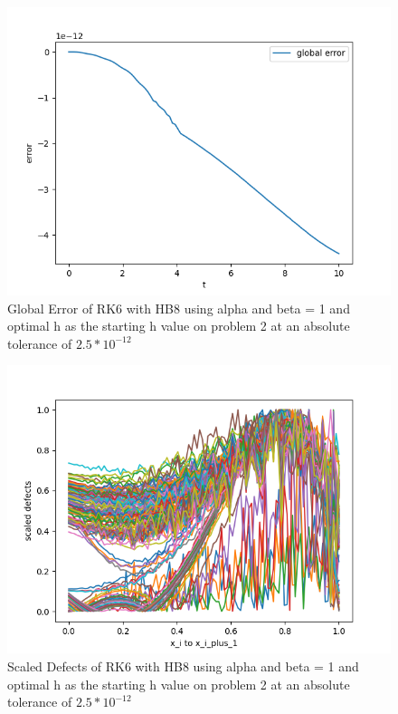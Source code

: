 \documentclass{article}
\begin{document}
\begin{figure}[H]
\centering
\includegraphics[width=0.7\linewidth]{./figures/sharp_tolerance_rk6_with_hb8_p2_global_error}
\caption{Global Error of RK6 with HB8 using alpha and beta = 1 and optimal h as the starting h value on problem 2 at an absolute tolerance of $2.5*10^{-12}$}
\label{fig:sharp_tolerance_rk6_with_hb8_p2_global_error}
\end{figure}

\begin{figure}[H]
\centering
\includegraphics[width=0.7\linewidth]{./figures/sharp_tolerance_rk6_with_hb8_p2_scaled_defects}
\caption{Scaled Defects of RK6 with HB8 using alpha and beta = 1 and optimal h as the starting h value on problem 2 at an absolute tolerance of $2.5*10^{-12}$}
\label{fig:sharp_tolerance_rk6_with_hb8_p2_scaled_defects}
\end{figure}
\end{document}

